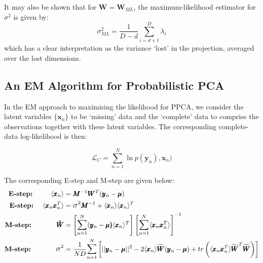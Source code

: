 It may also be shown that for $\pmb{W} = \pmb{W}_{ML}$, the maximum-likelihood estimator for $\sigma^2$ is given by:
\begin{equation}
\label{PPCA:eq8}
\sigma^2_{ML} = \dfrac{1}{D - d} \sum_{i=d+1}^D \lambda_i
\end{equation}
which has a clear interpretation as the variance `lost' in the projection, averaged over the lost dimensions.
\subsection{An EM Algorithm for Probabilistic PCA}
In the EM approach to maximising the likelihood for PPCA, we consider the latent variables  $\{\pmb{x}_n\}$ to be `missing' data and the `complete' data to comprise the observations together with these latent variables. The corresponding complete-data log-likelihood is then:

\begin{equation}
\label{PPCA:eq22}
\mathcal{L}_C = \sum^N_{n=1} \ln {p(\pmb{y}_n),\pmb{x}_n)} 
\end{equation}

The corresponding E-step and M-step are given below:
\begin{align}
\label{PPCA:EM}
\text{\textbf{E-step:}} \ \ \ \ \ \ \ \  \langle \pmb{x}_n \rangle &= \pmb{M}^{-1}\pmb{W}^T(\pmb{y}_{n} - \pmb{\mu}) \\
\label{PPCA:EM1}
\text{\textbf{E-step:}}  \ \ \ \ \langle \pmb{x}_n\pmb{x}_n^T \rangle &= \mathlarger{\sigma}^2\pmb{M}^{-1}+ \langle \pmb{x}_n\rangle \langle\pmb{x}_n \rangle ^T\\
\label{PPCA:EM2}
\text{\textbf{M-step:}} \ \ \ \ \ \ \ \ \ \ \  \pmb{\Tilde{W}} &= \left[ \mathlarger{\sum}_{n=1}^N(\pmb{y}_n - \pmb{\mu)} \langle \pmb{x}_n \rangle^T  \right] \left[ {\mathlarger{\sum}_{n=1}^N}\langle \pmb{x}_n\pmb{x}_n^T \rangle \right]^{-1} \\
\label{PPCA:EM3}
\text{\textbf{M-step:}}  \ \ \  \ \ \ \  \ \ \ \ \mathlarger{\sigma}^2 &= \dfrac{1}{ND} \mathlarger{\sum}^N_{n=1} \left[    || \pmb{y}_n - \pmb{\mu} ||^2 - 2\langle \pmb{x}_n \rangle \widetilde{\pmb{W}}(\pmb{y}_n - \pmb{\mu}) + tr \left( \langle \pmb{x}_n\pmb{x}_n^T \rangle \widetilde{\pmb{W}}^T\widetilde{\pmb{W}}  \right) \right]
\end{align}

